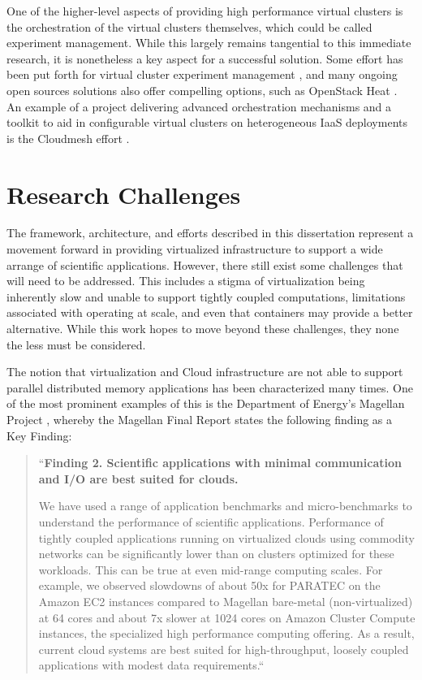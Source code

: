 One of the higher-level aspects of providing high performance virtual clusters is the orchestration of the virtual clusters themselves, which could be called experiment management. While this largely remains tangential to this immediate research, it is nonetheless a key aspect for a successful solution. Some effort has been put forth for virtual cluster experiment management \cite{las2010gce}, and many ongoing open sources solutions also offer compelling options, such as OpenStack Heat \cite{www-openstack-heat}.  An example of a project delivering advanced orchestration mechanisms and a toolkit to aid in configurable virtual clusters on heterogeneous IaaS deployments is the Cloudmesh effort \cite{von2014cloudmesh}.  


\section{Research Challenges}
\label{sec:chall}

The framework, architecture, and efforts described in this dissertation represent a movement forward in providing virtualized infrastructure to support a wide arrange of scientific applications. However, there still exist some challenges that will need to be addressed.  This includes a stigma of virtualization being inherently slow and unable to support tightly coupled computations, limitations associated with  operating at scale, and even that containers may provide a better alternative.  While this work hopes to move beyond these challenges, they none the less must be considered. 

The notion that virtualization and Cloud infrastructure are not able to support parallel distributed memory applications has been characterized many times. One of the most prominent examples of this is the Department of Energy's Magellan Project \cite{www-magellan}, whereby the Magellan Final Report \cite{MagellanFinal} states the following finding as a Key Finding:
  
\begin{quote}
``\textbf{Finding 2. Scientific applications with minimal communication and I/O are best suited for clouds.}

We have used a range of application benchmarks and micro-benchmarks to understand the performance of scientific applications. Performance of tightly coupled applications running on virtualized clouds using commodity networks can be significantly lower than on clusters optimized for these workloads. This can be true at even mid-range computing scales. For example, we observed slowdowns of about 50x for PARATEC on the Amazon EC2 instances compared to Magellan bare-metal (non-virtualized) at 64 cores and about 7x slower at 1024 cores on Amazon Cluster Compute instances, the specialized high performance computing offering. As a result, current cloud systems are best suited for high-throughput, loosely coupled applications with modest data requirements.``
\end{quote}

